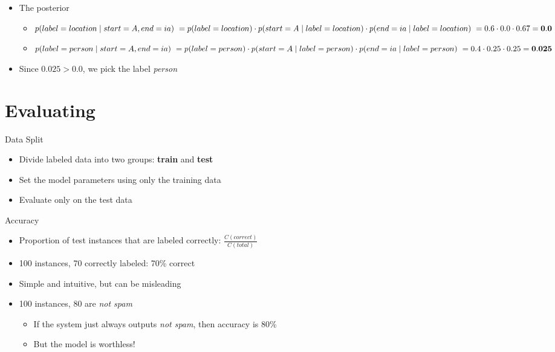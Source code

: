\documentclass[11pt,letterpaper]{article}
\begin{document}
\begin{itemize}
  \item The posterior
    \begin{itemize}
      \item $p(label=location \mid start=A, end=ia) \\
            ~ = p(label=location) \cdot p(start=A \mid label=location) \cdot p(end=ia \mid label=location) \\
            ~ = 0.6 \cdot 0.0 \cdot 0.67 = \mathbf{0.0}$
      \item $p(label=person \mid start=A, end=ia) \\
            ~ = p(label=person) \cdot p(start=A \mid label=person) \cdot p(end=ia \mid label=person) \\
            ~ = 0.4 \cdot 0.25 \cdot 0.25 = \mathbf{0.025}$
    \end{itemize}
  \item Since $0.025 > 0.0$, we pick the label \textit{person}

\end{itemize}




\section{Evaluating}

Data Split

\begin{itemize}
  \item Divide labeled data into two groups: \textbf{train} and \textbf{test}
  \item Set the model parameters using only the training data
  \item Evaluate only on the test data
\end{itemize}


Accuracy

\begin{itemize}
  \item Proportion of test instances that are labeled correctly: $\frac{C(correct)}{C(total)}$
  \item 100 instances, 70 correctly labeled: 70\% correct
  \item Simple and intuitive, but can be misleading
  \item 100 instances, 80 are \textit{not spam}
    \begin{itemize}
      \item If the system just always outputs \textit{not spam}, then accuracy is 80\%
      \item But the model is worthless!
    \end{itemize}
\end{itemize}
\end{document}
